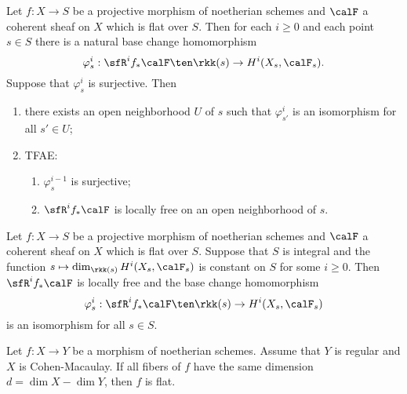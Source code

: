     \begin{theorem}\label{thm:cohomology_and_base_change}
        Let \(f:X \to S\) be a projective morphism of noetherian schemes and \(\calF\) a coherent sheaf on \(X\) which is flat over \(S\). 
        Then for each \(i \geq 0\) and each point \(s \in S\) there is a natural base change homomorphism
        \[
            \varphi_s^i: \sfR^i f_*\calF \ten \rkk(s) \to H^i(X_s,\calF_s).
        \]
        Suppose that \(\varphi_s^i\) is surjective. 
        Then
        \begin{enumerate}
            \item there exists an open neighborhood \(U\) of \(s\) such that \(\varphi_{s'}^i\) is an isomorphism for all \(s' \in U\);
            \item TFAE:
                \begin{enumerate}
                    \item \(\varphi_{s}^{i-1}\) is surjective;
                    \item \(\sfR^i f_*\calF\) is locally free on an open neighborhood of \(s\).
                \end{enumerate}
        \end{enumerate}
    \end{theorem}

    \begin{theorem}\label{thm:Grauert_theorem}
        Let \(f:X \to S\) be a projective morphism of noetherian schemes and \(\calF\) a coherent sheaf on \(X\) which is flat over \(S\).
        Suppose that \(S\) is integral and the function \(s \mapsto \dim_{\rkk(s)} H^i(X_s,\calF_s)\) is constant on \(S\) for some \(i \geq 0\). 
        Then \(\sfR^i f_*\calF\) is locally free and the base change homomorphism
        \[
            \varphi_s^i: \sfR^i f_*\calF \ten \rkk(s) \to H^i(X_s,\calF_s)
        \]
        is an isomorphism for all \(s \in S\).
    \end{theorem}

    \begin{theorem}\label{thm:miracle_flatness}
        Let \(f:X \to Y\) be a morphism of noetherian schemes. 
        Assume that \(Y\) is regular and \(X\) is Cohen-Macaulay. 
        If all fibers of \(f\) have the same dimension \(d = \dim X - \dim Y\), then \(f\) is flat.
    \end{theorem}

